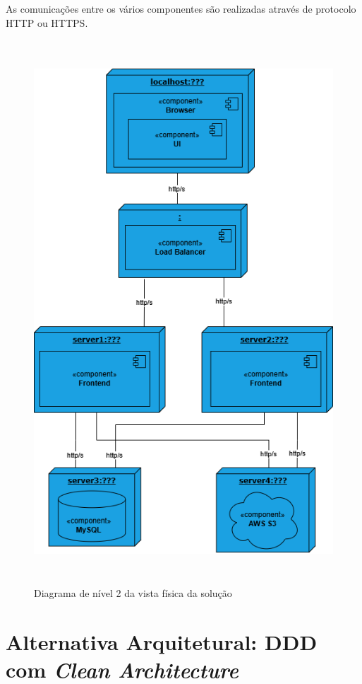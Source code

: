 As comunicações entre os vários componentes são realizadas através de protocolo HTTP ou HTTPS.

\begin{figure}[H]
    \centering
    \includegraphics[height=8in,keepaspectratio]{frontmatter/assets/diagrams/Physical View/physical_view_lv2.drawio.png}
    \caption{Diagrama de nível 2 da vista física da solução}
    \label{fig:physical_view_lv2}
\end{figure}

\section{Alternativa Arquitetural: DDD com \textit{Clean Architecture}}
\label{sec:SolAlt}


